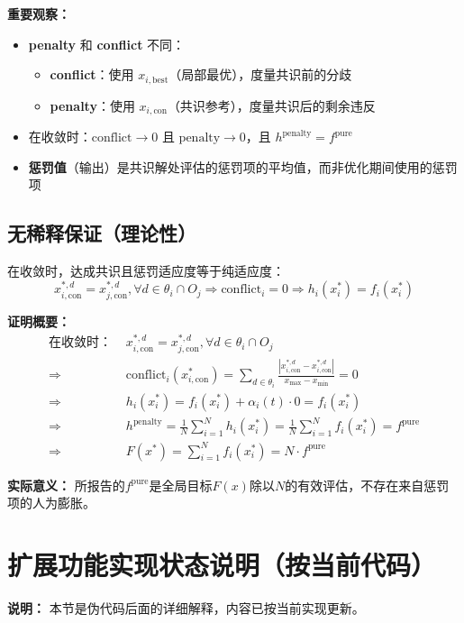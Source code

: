 \documentclass[11pt,a3paper]{ctexart}
\begin{document}
\textbf{重要观察：}
\begin{itemize}
    \item \textbf{penalty} 和 \textbf{conflict} 不同：
    \begin{itemize}
        \item \textbf{conflict}：使用 $x_{i,\text{best}}$（局部最优），度量共识前的分歧
        \item \textbf{penalty}：使用 $x_{i,\text{con}}$（共识参考），度量共识后的剩余违反
    \end{itemize}
    \item 在收敛时：$\text{conflict} \to 0$ 且 $\text{penalty} \to 0$，且 $h^{\text{penalty}} = f^{\text{pure}}$
    \item \textbf{惩罚值}（输出）是共识解处评估的惩罚项的平均值，而非优化期间使用的惩罚项
\end{itemize}
\subsection{无稀释保证（理论性）}

在收敛时，达成共识且惩罚适应度等于纯适应度：
\begin{equation}
x_{i,\text{con}}^{*,d} = x_{j,\text{con}}^{*,d}, \forall d \in \theta_i \cap O_j \Rightarrow \text{conflict}_i = 0 \Rightarrow h_i(x_i^*) = f_i(x_i^*)
\end{equation}

\textbf{证明概要：}
\begin{align}
\text{在收敛时： } & x_{i,\text{con}}^{*,d} = x_{j,\text{con}}^{*,d}, \forall d \in \theta_i \cap O_j \\
\Rightarrow & \text{conflict}_i(x_{i,\text{con}}^*) = \sum_{d \in \theta_i} \frac{|x_{i,\text{con}}^{*,d} - x_{i,\text{con}}^{*,d}|}{x_{\max} - x_{\min}} = 0 \\
\Rightarrow & h_i(x_i^*) = f_i(x_i^*) + \alpha_i(t) \cdot 0 = f_i(x_i^*) \\
\Rightarrow & h^{\text{penalty}} = \frac{1}{N}\sum_{i=1}^N h_i(x_i^*) = \frac{1}{N}\sum_{i=1}^N f_i(x_i^*) = f^{\text{pure}} \\
\Rightarrow & F(x^*) = \sum_{i=1}^N f_i(x_i^*) = N \cdot f^{\text{pure}}
\end{align}

\textbf{实际意义：} 所报告的$f^{\text{pure}}$是全局目标$F(x)$除以$N$的有效评估，不存在来自惩罚项的人为膨胀。

\section{扩展功能实现状态说明（按当前代码）}
\textbf{说明：} 本节是伪代码后面的详细解释，内容已按当前实现更新。
\end{document}
